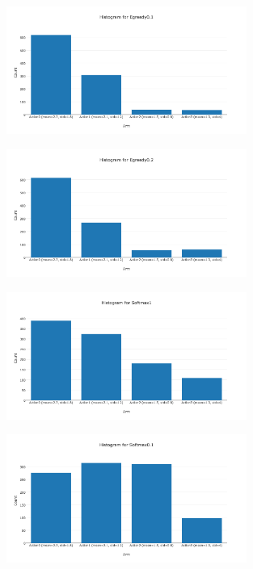 \documentclass[11pt]{article}
\begin{document}
\begin{figure}[H]
   \centering
   \includegraphics[width=0.7\textwidth]{img/1-2/h3.png}
\end{figure}

\begin{figure}[H]
   \centering
   \includegraphics[width=0.7\textwidth]{img/1-2/h4.png}
\end{figure}

\begin{figure}[H]
   \centering
   \includegraphics[width=0.7\textwidth]{img/1-2/h5.png}
\end{figure}

\begin{figure}[H]
   \centering
   \includegraphics[width=0.7\textwidth]{img/1-2/h6.png}
\end{figure}
\end{document}
